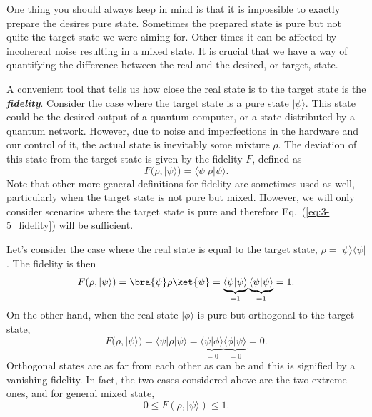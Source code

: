 One thing you should always keep in mind is that it is impossible to exactly prepare the desires pure state.
Sometimes the prepared state is pure but not quite the target state we were aiming for.
Other times it can be affected by incoherent noise resulting in a mixed state.
It is crucial that we have a way of quantifying the difference between the real and the desired, or target, state.

A convenient tool that tells us how close the real state is to the target state is the \textbf{\emph{fidelity}}.
Consider the case where the target state is a pure state $|\psi\rangle$.
This state could be the desired output of a quantum computer, or a state distributed by a quantum network.
However, due to noise and imperfections in the hardware and our control of it, the actual state is inevitably some mixture $\rho$.
The deviation of this state from the target state is given by the fidelity $F$, defined as
\begin{equation}
    F(\rho,|\psi\rangle) = \langle\psi|\rho|\psi\rangle.
    \label{eq:3-5_fidelity}
\end{equation}
Note that other more general definitions for fidelity are sometimes used as well, particularly when the target state is not pure but mixed.
However, we will only consider scenarios where the target state is pure and therefore Eq.~(\ref{eq:3-5_fidelity}) will be sufficient.

Let's consider the case where the real state is equal to the target state, $\rho=|\psi\rangle\langle\psi|$.
The fidelity is then
\begin{equation}
    F(\rho,|\psi\rangle) = \bra{\psi}\rho\ket{\psi} = \underbrace{\langle\psi|\psi\rangle}_{=1} \underbrace{\langle\psi|\psi\rangle}_{=1} = 1.
\end{equation}
On the other hand, when the real state $|\phi\rangle$ is pure but orthogonal to the target state,
\begin{equation}
    F(\rho,|\psi\rangle) = \langle\psi|\rho|\psi\rangle = \underbrace{\langle\psi|\phi\rangle}_{=0} \underbrace{\langle\phi|\psi\rangle}_{=0} = 0.
\end{equation}
Orthogonal states are as far from each other as can be and this is signified by a vanishing fidelity.
In fact, the two cases considered above are the two extreme ones, and for general mixed state,
\begin{equation}
    0 \leq F(\rho,|\psi\rangle) \leq 1.
\end{equation}

